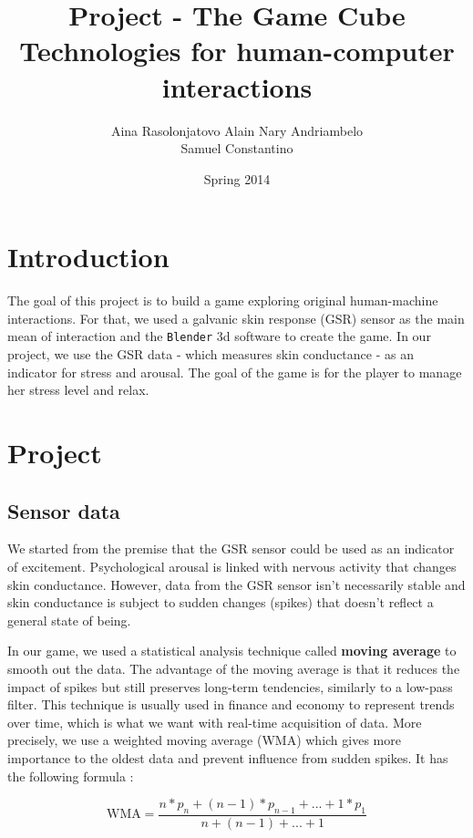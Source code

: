 \documentclass[12pt,a4paper]{article}
\title{\LARGE \textbf{Project - The Game Cube\textregistered}\\
	\bigskip
	\bigskip
	\large Technologies for human-computer interactions}
\author{Aina Rasolonjatovo Alain Nary Andriambelo \\ Samuel Constantino}
\date{Spring 2014}
\begin{document}
	\maketitle


\section{Introduction}

The goal of this project is to build a game exploring original human-machine interactions. For that, we used a galvanic skin response (GSR) sensor as the main mean of interaction and the \texttt{Blender} 3d software to create the game. In our project, we use the GSR data - which measures skin conductance - as an indicator for stress and arousal. The goal of the game is for the player to manage her stress level and relax. 

\section{Project}

\subsection{Sensor data}

We started from the premise that the GSR sensor could be used as an indicator of excitement. Psychological arousal is linked with nervous activity that changes skin conductance. However, data from the GSR sensor isn't necessarily stable and skin conductance is subject to sudden changes (spikes) that doesn't reflect a general state of being.

In our game, we used a statistical analysis technique called \textbf{moving average} to smooth out the data. The advantage of the moving average is that it reduces the impact of spikes but still preserves long-term tendencies, similarly to a low-pass filter. This technique is usually used in finance and economy to represent trends over time, which is what we want with real-time acquisition of data. More precisely, we use a weighted moving average (WMA) which gives more importance to the oldest data and prevent influence from sudden spikes. It has the following formula : 

\begin{equation}
\text{WMA} = \frac{n * p_n + (n - 1) * p_{n-1} + ... + 1 * p_{1}}{n + (n-1) + ... + 1}
\end{equation}
\end{document}
